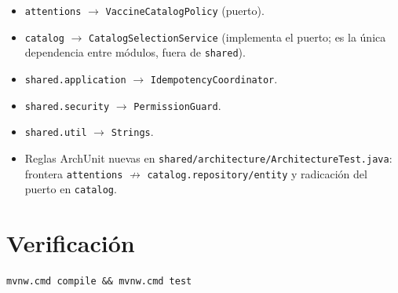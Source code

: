 \documentclass[11pt,a4paper]{article}
\begin{document}
\begin{itemize}
  \item \texttt{attentions} $\to$ \texttt{VaccineCatalogPolicy} (puerto).
  \item \texttt{catalog} $\to$ \texttt{CatalogSelectionService} (implementa el
        puerto; es la única dependencia entre módulos, fuera de \texttt{shared}).
  \item \texttt{shared.application} $\to$ \texttt{IdempotencyCoordinator}.
  \item \texttt{shared.security} $\to$ \texttt{PermissionGuard}.
  \item \texttt{shared.util} $\to$ \texttt{Strings}.
  \item Reglas ArchUnit nuevas en
        \texttt{shared/architecture/ArchitectureTest.java}: frontera
        \texttt{attentions} {$\nrightarrow$} \texttt{catalog.repository/entity}
        y radicación del puerto en \texttt{catalog}.
\end{itemize}

\section{Verificación}

\begin{lstlisting}
mvnw.cmd compile && mvnw.cmd test
\end{lstlisting}
\end{document}
